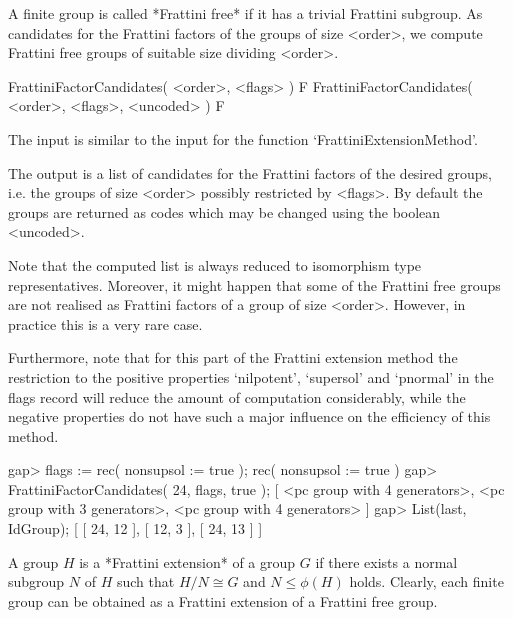 

A finite group is called *Frattini free* if it has a trivial
Frattini subgroup. As candidates for the Frattini factors of
the groups of size <order>, we compute Frattini free groups of
suitable size dividing <order>. 

\>FrattiniFactorCandidates( <order>, <flags> ) F
\>FrattiniFactorCandidates( <order>, <flags>, <uncoded> ) F

The input is similar to the input for the function 
`FrattiniExtensionMethod'. 

The output is a list of candidates for the Frattini factors of the
desired groups, i.e. the groups of size <order> possibly restricted
by <flags>. By default the groups are returned as codes which may
be changed using the boolean <uncoded>. 

Note that the computed list is always reduced to isomorphism type
representatives. Moreover, it might happen that some of the Frattini 
free groups are not realised as Frattini factors of a group of size 
<order>. However, in practice this is a very rare case.

Furthermore, note that for this part of the Frattini extension method
the restriction to the positive properties `nilpotent', `supersol' and 
`pnormal' in the flags record will reduce the amount of computation 
considerably, while the negative properties do not have such a major 
influence on the efficiency of this method.

\beginexample
gap> flags := rec( nonsupsol := true );
rec( nonsupsol := true )
gap> FrattiniFactorCandidates( 24, flags, true );
[ <pc group with 4 generators>, <pc group with 3 generators>, 
  <pc group with 4 generators> ]
gap> List(last, IdGroup);
[ [ 24, 12 ], [ 12, 3 ], [ 24, 13 ] ]
\endexample



A group $H$ is a *Frattini extension* of a group $G$ if there
exists a normal subgroup $N$ of $H$ such that $H/N \cong G$ and
$N \leq \phi(H)$ holds. Clearly, each finite group can be obtained
as a Frattini extension of a Frattini free group.

